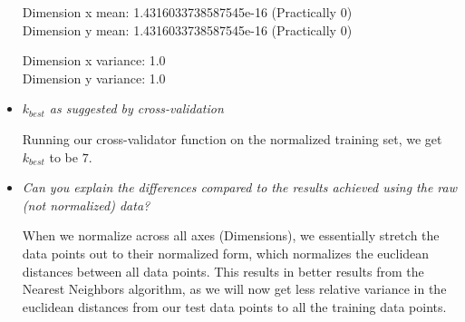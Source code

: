 \documentclass[12pt, a4paper]{article}
\begin{document}
\begin{itemize}
Dimension x mean: 1.4316033738587545e-16 (Practically 0) \\
Dimension y mean: 1.4316033738587545e-16 (Practically 0)

Dimension x variance: 1.0 \\
Dimension y variance: 1.0

\item \textit{$k_{best}$ as suggested by cross-validation}

Running our cross-validator function on the normalized training set, we get $k_{best}$ to be $7$.

\item \textit{Can you explain the differences compared to the results achieved using the raw (not normalized) data?}

When we normalize across all axes (Dimensions), we essentially stretch the data points out to their normalized form, which normalizes the euclidean distances between all data points. This results in better results from the Nearest Neighbors algorithm, as we will now get less relative variance in the euclidean distances from our test data points to all the training data points.

\end{itemize}
\end{document}
